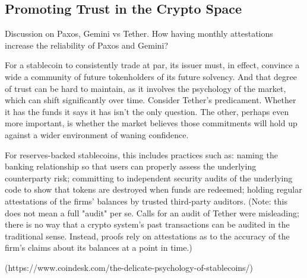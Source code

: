 %
%
%
%





\subsection{Promoting Trust in the Crypto Space}
Discussion on Paxos, Gemini vs Tether. How having monthly attestations increase the reliability of Paxos and Gemini?

For a stablecoin to consistently trade at par, its issuer must, in effect, convince a wide a community of future tokenholders of its future solvency. And that degree of trust can be hard to maintain, as it involves the psychology of the market, which can shift significantly over time.
Consider Tether's predicament. Whether it has the funds it says it has isn't the only question. The other, perhaps even more important, is whether the market believes those commitments will hold up against a wider environment of waning confidence.

For reserves-backed stablecoins, this includes practices such as: naming the banking relationship so that users can properly assess the underlying counterparty risk; committing to independent security audits of the underlying code to show that tokens are destroyed when funds are redeemed; holding regular attestations of the firms' balances by trusted third-party auditors. (Note: this does not mean a full "audit" per se. Calls for an audit of Tether were misleading; there is no way that a crypto system's past transactions can be audited in the traditional sense. Instead, proofs rely on attestations as to the accuracy of the firm's claims about its balances at a point in time.)

(https://www.coindesk.com/the-delicate-psychology-of-stablecoins/)


